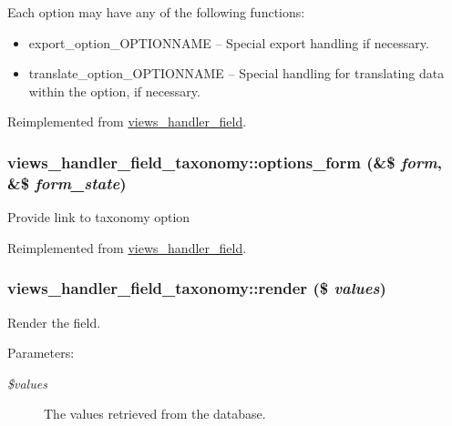  Each option may have any of the following functions:\begin{itemize}
\item export\_\-option\_\-OPTIONNAME -- Special export handling if necessary.\item translate\_\-option\_\-OPTIONNAME -- Special handling for translating data within the option, if necessary. \end{itemize}


Reimplemented from \hyperlink{classviews__handler__field_64c69a8a3697603f8283405071c25b76}{views\_\-handler\_\-field}.\hypertarget{classviews__handler__field__taxonomy_df66d3026b9409dd3237c5ebef994595}{
\subsubsection[{options\_\-form}]{\setlength{\rightskip}{0pt plus 5cm}views\_\-handler\_\-field\_\-taxonomy::options\_\-form (\&\$ {\em form}, \/  \&\$ {\em form\_\-state})}}
\label{classviews__handler__field__taxonomy_df66d3026b9409dd3237c5ebef994595}


Provide link to taxonomy option 

Reimplemented from \hyperlink{classviews__handler__field_0435d161922b7b4b84f02a2e79bb947a}{views\_\-handler\_\-field}.\hypertarget{classviews__handler__field__taxonomy_02a50e2e97c9faf4e86c5461edf5d547}{
\subsubsection[{render}]{\setlength{\rightskip}{0pt plus 5cm}views\_\-handler\_\-field\_\-taxonomy::render (\$ {\em values})}}
\label{classviews__handler__field__taxonomy_02a50e2e97c9faf4e86c5461edf5d547}


Render the field.

\begin{Desc}
\item[Parameters:]
\begin{description}
\item[{\em \$values}]The values retrieved from the database. \end{description}
\end{Desc}


